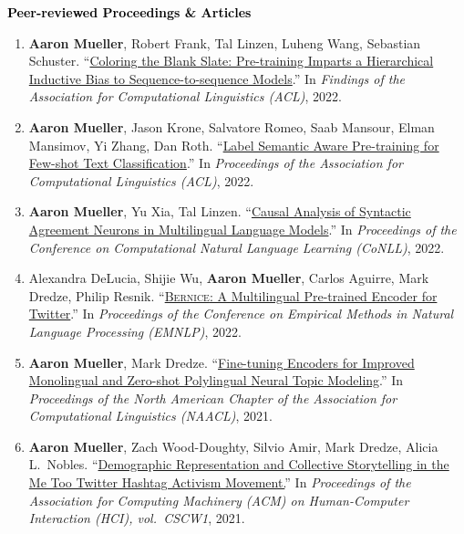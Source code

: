 \documentclass[10pt]{article}
\renewcommand{\subsection}[1]{\textcolor{black}{#1}}
\providecommand*\titlelink[2]{\href{#1}{\textcolor{accent}{#2}}}
\begin{document}
	\subsection{\textbf{Peer-reviewed Proceedings \& Articles}}
	\begin{enumerate}[leftmargin=*, topsep=0pt, itemsep=0.25ex, partopsep=0ex, parsep=1ex]
	\item \textbf{Aaron Mueller}, Robert Frank, Tal Linzen, Luheng Wang, Sebastian Schuster. ``\titlelink{https://aclanthology.org/2022.findings-acl.106.pdf}{Coloring the Blank Slate: Pre-training Imparts a Hierarchical Inductive Bias to Sequence-to-sequence Models}.'' In \emph{Findings of the Association for Computational Linguistics (ACL)}, 2022.

	\item \textbf{Aaron Mueller}, Jason Krone, Salvatore Romeo, Saab Mansour, Elman Mansimov, Yi Zhang, Dan Roth. ``\titlelink{https://aclanthology.org/2022.acl-long.570/}{Label Semantic Aware Pre-training for Few-shot Text Classification}.'' In \emph{Proceedings of the Association for Computational Linguistics (ACL)}, 2022.\label{pub:lsap}
	
	\item \textbf{Aaron Mueller}, Yu Xia, Tal Linzen. ``\titlelink{https://arxiv.org/abs/2210.14328}{Causal Analysis of Syntactic Agreement Neurons in Multilingual Language Models}.'' In \emph{Proceedings of the Conference on Computational Natural Language Learning (CoNLL)}, 2022.\label{pub:causal-multiling}
	
	\item Alexandra DeLucia, Shijie Wu, \textbf{Aaron Mueller}, Carlos Aguirre, Mark Dredze, Philip Resnik. ``\titlelink{https://preview.aclanthology.org/emnlp-22-ingestion/2022.emnlp-main.415/}{\textsc{Bernice}: A Multilingual Pre-trained Encoder for Twitter}.'' In \emph{Proceedings of the Conference on Empirical Methods in Natural Language Processing (EMNLP)}, 2022.
			
	\item \textbf{Aaron Mueller}, Mark Dredze. ``\titlelink{https://aclanthology.org/2021.naacl-main.243/}{Fine-tuning Encoders for Improved Monolingual and Zero-shot Polylingual Neural Topic Modeling}.'' In \emph{Proceedings of the North American Chapter of the Association for Computational Linguistics (NAACL)}, 2021.  
	
	\item \textbf{Aaron Mueller}, Zach Wood-Doughty, Silvio Amir, Mark Dredze, Alicia L.\ Nobles. ``\titlelink{https://dl.acm.org/doi/10.1145/3449181}{Demographic Representation and Collective Storytelling in the Me Too Twitter Hashtag Activism Movement.}'' In \emph{Proceedings of the Association for Computing Machinery (ACM) on Human-Computer Interaction (HCI), vol.\ CSCW1}, 2021.


\end{enumerate}
\end{document}
